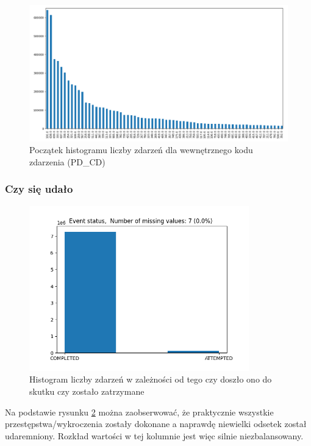 \documentclass{classrep}
\begin{document}
{{{\begin{figure}[!htbp]
                    \centering
                    \includegraphics[width=\textwidth]{img/hist_pd_cd.png}
                    \caption{Początek histogramu liczby zdarzeń dla wewnętrznego kodu zdarzenia (PD\_CD)}
                    \label{hist_pd_cd}
                \end{figure}
                \FloatBarrier
            }

            \subsubsection{Czy się udało} {
                \begin{figure}[!htbp]
                    \centering
                    \includegraphics[width=0.85\textwidth]{img/Eventstatus-133630.png}
                    \caption{Histogram liczby zdarzeń w zależności od tego czy doszło ono do skutku czy zostało zatrzymane}
                    \label{hist_is_completed}
                \end{figure}
                \FloatBarrier
                Na podstawie rysunku \ref{hist_is_completed} można zaobserwować, że
                praktycznie wszystkie przestępstwa/wykroczenia zostały dokonane a
                naprawdę niewielki odsetek został udaremniony. Rozkład wartości w tej
                kolumnie jest więc silnie niezbalansowany.

}}}
\end{document}
